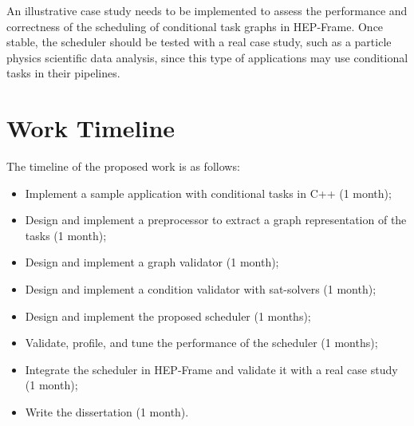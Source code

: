 An illustrative case study needs to be implemented to assess the performance and correctness of the scheduling of conditional task graphs in HEP-Frame. Once stable, the scheduler should be tested with a real case study, such as a particle physics scientific data analysis, since this type of applications may use conditional tasks in their pipelines. 

\section{Work Timeline}

The timeline of the proposed work is as follows:
\begin{itemize}
    \item Implement a sample application with conditional tasks in C++ (1 month);
    \item Design and implement a preprocessor to extract a graph representation of the tasks (1 month);
    \item Design and implement a graph validator (1 month);
    \item Design and implement a condition validator with sat-solvers (1 month);
    \item Design and implement the proposed scheduler  (1 months);
    \item Validate, profile, and tune the performance of the scheduler (1 months);
    \item Integrate the scheduler in HEP-Frame and validate it with a real case study (1 month);
    \item Write the dissertation (1 month).
\end{itemize}